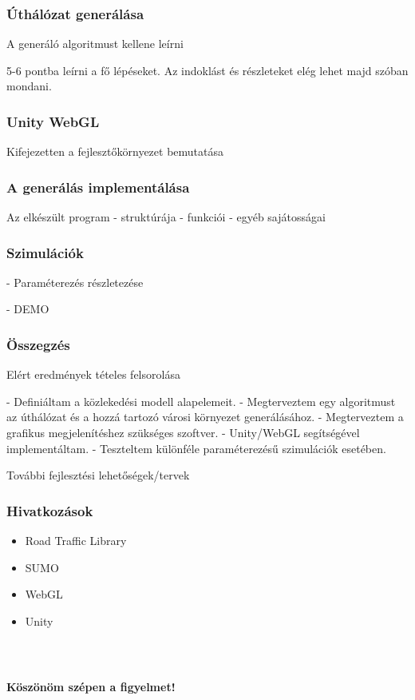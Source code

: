 \documentclass{beamer}
\begin{document}
\begin{frame}[fragile]
\frametitle{Úthálózat generálása}

A generáló algoritmust kellene leírni

5-6 pontba leírni a fő lépéseket.
Az indoklást és részleteket elég lehet majd szóban mondani.

\end{frame}

\begin{frame}[fragile]
\frametitle{Unity WebGL}

Kifejezetten a fejlesztőkörnyezet bemutatása

\end{frame}

\begin{frame}[fragile]
\frametitle{A generálás implementálása}

Az elkészült program
- struktúrája
- funkciói
- egyéb sajátosságai

\end{frame}

\begin{frame}[fragile]
\frametitle{Szimulációk}

- Paraméterezés részletezése

- DEMO

\end{frame}

\begin{frame}[fragile]
\frametitle{Összegzés}

Elért eredmények tételes felsorolása

- Definiáltam a közlekedési modell alapelemeit.
- Megterveztem egy algoritmust az úthálózat és a hozzá tartozó városi környezet generálásához.
- Megterveztem a grafikus megjelenítéshez szükséges szoftver.
- Unity/WebGL segítségével implementáltam.
- Teszteltem különféle paraméterezésű szimulációk esetében.

További fejlesztési lehetőségek/tervek

\end{frame}

\begin{frame}[fragile]
\frametitle{Hivatkozások}

\begin{itemize}

\item Road Traffic Library
\item SUMO
\item WebGL
\item Unity

\end{itemize}

\end{frame}

\begin{frame}[fragile]
    \frametitle{\ }

\begin{center}
\Large \textbf{Köszönöm szépen a figyelmet!}
\end{center}

\end{frame}
\end{document}

